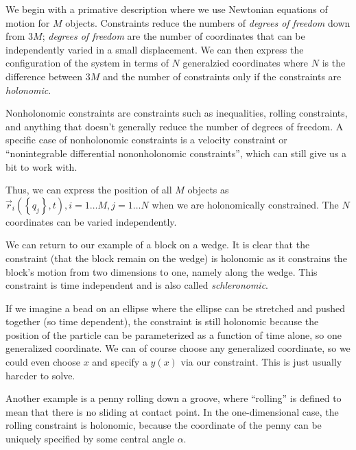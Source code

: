 \documentclass[10pt]{report}
\begin{document}
We begin with a primative description where we use Newtonian equations of motion for $M$ objects. Constraints reduce the numbers of \emph{degrees of freedom} down from $3M$; \emph{degrees of freedom} are the number of coordinates that can be independently varied in a small displacement. We can then express the configuration of the system in terms of $N$ generalzied coordinates where $N$ is the difference between $3M$ and the number of constraints only if the constraints are \emph{holonomic}. 

Nonholonomic constraints are constraints such as inequalities, rolling constraints, and anything that doesn't generally reduce the number of degrees of freedom. A specific case of nonholonomic constraints is a velocity constraint or ``nonintegrable differential nononholonomic constraints'', which can still give us a bit to work with.

Thus, we can express the position of all $M$ objects as $\vec{r}_i\left( \left\{ q_j \right\},t \right), i = 1\dots M, j = 1 \dots N$ when we are holonomically constrained. The $N$ coordinates can be varied independently. 

We can return to our example of a block on a wedge. It is clear that the constraint (that the block remain on the wedge) is holonomic as it constrains the block's motion from two dimensions to one, namely along the wedge. This constraint is time independent and is also called \emph{schleronomic}.

If we imagine a bead on an ellipse where the ellipse can be stretched and pushed together (so time dependent), the constraint is still holonomic because the position of the particle can be parameterized as a function of time alone, so one generalized coordinate. We can of course choose any generalized coordinate, so we could even choose $x$ and specify a $y(x)$ via our constraint. This is just usually harcder to solve.

Another example is a penny rolling down a groove, where ``rolling'' is defined to mean that there is no sliding at contact point. In the one-dimensional case, the rolling constraint is holonomic, because the coordinate of the penny can be uniquely specified by some central angle $\alpha$. 
\end{document}
